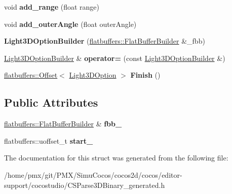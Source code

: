 \begin{DoxyCompactItemize}
void {\bfseries add\+\_\+range} (float range)
\item 
\mbox{\label{structflatbuffers_1_1Light3DOptionBuilder_abd958355223ac1c98798a69c2c751f50}} 
void {\bfseries add\+\_\+outer\+Angle} (float outer\+Angle)
\item 
\mbox{\label{structflatbuffers_1_1Light3DOptionBuilder_af180a3f10903e8024347ee18d2b14a6d}} 
{\bfseries Light3\+D\+Option\+Builder} (\hyperlink{classflatbuffers_1_1FlatBufferBuilder}{flatbuffers\+::\+Flat\+Buffer\+Builder} \&\+\_\+fbb)
\item 
\mbox{\label{structflatbuffers_1_1Light3DOptionBuilder_af9cba35fba7f78b37ae54ee345bcb045}} 
\hyperlink{structflatbuffers_1_1Light3DOptionBuilder}{Light3\+D\+Option\+Builder} \& {\bfseries operator=} (const \hyperlink{structflatbuffers_1_1Light3DOptionBuilder}{Light3\+D\+Option\+Builder} \&)
\item 
\mbox{\label{structflatbuffers_1_1Light3DOptionBuilder_a0d19356292ea4f13101a45f25a05f676}} 
\hyperlink{structflatbuffers_1_1Offset}{flatbuffers\+::\+Offset}$<$ \hyperlink{structflatbuffers_1_1Light3DOption}{Light3\+D\+Option} $>$ {\bfseries Finish} ()
\end{DoxyCompactItemize}
\subsection*{Public Attributes}
\begin{DoxyCompactItemize}
\item 
\mbox{\label{structflatbuffers_1_1Light3DOptionBuilder_ab8f683ce32536ae5fe6b9fb51d2ddc44}} 
\hyperlink{classflatbuffers_1_1FlatBufferBuilder}{flatbuffers\+::\+Flat\+Buffer\+Builder} \& {\bfseries fbb\+\_\+}
\item 
\mbox{\label{structflatbuffers_1_1Light3DOptionBuilder_a3fee06138bd8df9eceb957e75f078a3a}} 
flatbuffers\+::uoffset\+\_\+t {\bfseries start\+\_\+}
\end{DoxyCompactItemize}


The documentation for this struct was generated from the following file\+:\begin{DoxyCompactItemize}
\item 
/home/pmx/git/\+P\+M\+X/\+Simu\+Cocos/cocos2d/cocos/editor-\/support/cocostudio/C\+S\+Parse3\+D\+Binary\+\_\+generated.\+h\end{DoxyCompactItemize}

